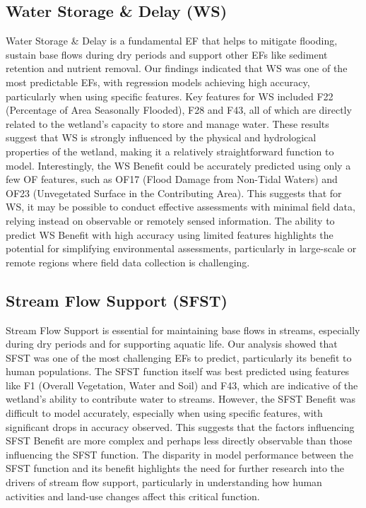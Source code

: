 \documentclass[12pt,letterpaper]{article}
\begin{document}
\subsection{Water Storage \& Delay (\ac{WS})}
Water Storage \& Delay is a fundamental \ac{EF} that helps to mitigate flooding, sustain base flows during dry periods and support other \acp{EF} like sediment retention and nutrient removal.
Our findings indicated that \ac{WS} was one of the most predictable \acp{EF}, with regression models achieving high accuracy, particularly when using specific features.
Key features for \ac{WS} included F22 (Percentage of Area Seasonally Flooded), F28 and F43, all of which are directly related to the wetland’s capacity to store and manage water.
These results suggest that \ac{WS} is strongly influenced by the physical and hydrological properties of the wetland, making it a relatively straightforward function to model.
Interestingly, the \ac{WS} Benefit could be accurately predicted using only a few \ac{OF} features, such as OF17 (Flood Damage from Non-Tidal Waters) and OF23 (Unvegetated Surface in the Contributing Area).
This suggests that for \ac{WS}, it may be possible to conduct effective assessments with minimal field data, relying instead on observable or remotely sensed information.
The ability to predict \ac{WS} Benefit with high accuracy using limited features highlights the potential for simplifying environmental assessments, particularly in large-scale or remote regions where field data collection is challenging.

\subsection{Stream Flow Support (\ac{SFST})}
Stream Flow Support is essential for maintaining base flows in streams, especially during dry periods and for supporting aquatic life.
Our analysis showed that \ac{SFST} was one of the most challenging \acp{EF} to predict, particularly its benefit to human populations.
The \ac{SFST} function itself was best predicted using features like F1 (Overall Vegetation, Water and Soil) and F43, which are indicative of the wetland’s ability to contribute water to streams.
However, the \ac{SFST} Benefit was difficult to model accurately, especially when using specific features, with significant drops in accuracy observed.
This suggests that the factors influencing \ac{SFST} Benefit are more complex and perhaps less directly observable than those influencing the \ac{SFST} function.
The disparity in model performance between the \ac{SFST} function and its benefit highlights the need for further research into the drivers of stream flow support, particularly in understanding how human activities and land-use changes affect this critical function.
\end{document}
